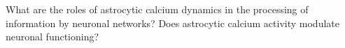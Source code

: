 What are the roles of astrocytic calcium dynamics in the processing of information by neuronal networks?
Does astrocytic calcium activity modulate neuronal functioning?

